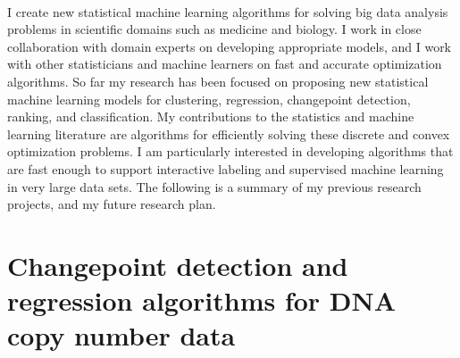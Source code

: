 \documentclass{article}
\begin{document}
\mbox{ }




I create new statistical machine learning algorithms for solving big
data analysis problems in scientific domains such as medicine and
biology. I work in close collaboration with domain experts on
developing appropriate models, and I work with other statisticians and
machine learners on fast and accurate optimization algorithms. So far
my research has been focused on proposing new statistical machine
learning models for clustering, regression, changepoint detection,
ranking, and classification. My contributions to the statistics and
machine learning literature are algorithms for efficiently solving
these discrete and convex optimization problems.  I am particularly
interested in developing algorithms that are fast enough to support
interactive labeling and supervised machine learning in very large
data sets. The following is a summary of my previous research
projects, and my future research plan.

\section{Changepoint detection and regression algorithms for DNA copy
  number data}
\end{document}
